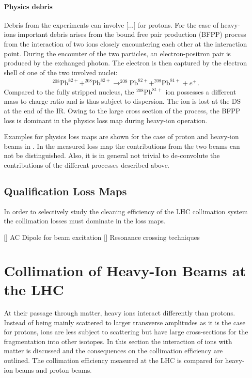 \paragraph{Physics debris} Debris from the experiments can involve [...] for protons. For the case of heavy-ions important debris arises from the bound free pair production (BFPP) process from the interaction of two \lead ions closely encountering each other at the interaction point. During the encounter of the two particles, an electron-positron pair is produced by the exchanged photon. The electron is then captured by the electron shell of one of the two involved nuclei:
\begin{align}
^{208}\text{Pb}^{82+} + ^{208}\text{Pb}^{82+} \rightarrow ^{208}\text{Pb}^{82+} + ^{208}\text{Pb}^{81+} + e^+ \, .
\end{align}
Compared to the fully stripped nucleus, the $^{208}\text{Pb}^{81+}$ ion possesses a different mass to charge ratio and is thus subject to dispersion. The ion is lost at the DS at the end of the IR. Owing to the large cross section of the process, the BFPP loss is dominant in the physics loss map during heavy-ion operation.

Examples for physics loss maps are shown for the case of proton and heavy-ion beams in . In the measured loss map the contributions from the two beams can not be distinguished. Also, it is in general not trivial to de-convolute the contributions of the different processes described above. 
%
\subsection{Qualification Loss Maps}


In order to selectively study the cleaning efficiency of the LHC collimation system the collimation losses must dominate in the loss maps.


[] AC Dipole for beam excitation
[] Resonance crossing techniques



\section{Collimation of Heavy-Ion Beams at the LHC}

At their passage through matter, heavy ions interact differently than protons. Instead of being mainly scattered to larger transverse amplitudes as it is the case for protons, ions are less subject to scattering but have large cross-sections for the fragmentation into other isotopes.  In this section the interaction of ions with matter is discussed and the consequences on the collimation efficiency are outlined. The collimation efficiency measured at the LHC is compared for heavy-ion beams and proton beams.


